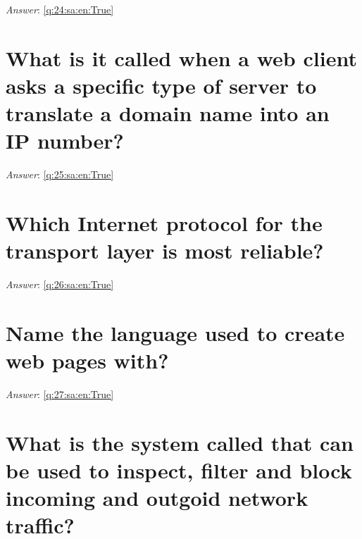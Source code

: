 \documentclass[a4paper,11pt,oneside]{book}
\begin{document}
\begin{sloppypar}
\noindent\makebox[\textwidth]{\hrulefill}

\vspace{1cm}

\textit{Answer}: \autoref{q:24:sa:en:True}



\section{What is it called when a web client asks a specific type of server to translate a domain name into an IP number?}

\label{q:25:sa:en:False}

\vspace{2cm}

\noindent\makebox[\textwidth]{\hrulefill}

\vspace{1cm}

\textit{Answer}: \autoref{q:25:sa:en:True}



\section{Which Internet protocol for the transport layer is most reliable?}

\label{q:26:sa:en:False}

\vspace{2cm}

\noindent\makebox[\textwidth]{\hrulefill}

\vspace{1cm}

\textit{Answer}: \autoref{q:26:sa:en:True}



\section{Name the language used to create web pages with?}

\label{q:27:sa:en:False}

\vspace{2cm}

\noindent\makebox[\textwidth]{\hrulefill}

\vspace{1cm}

\textit{Answer}: \autoref{q:27:sa:en:True}



\section{What is the system called that can be used to inspect, filter and block incoming and outgoid network traffic?}


\end{sloppypar}
\end{document}
